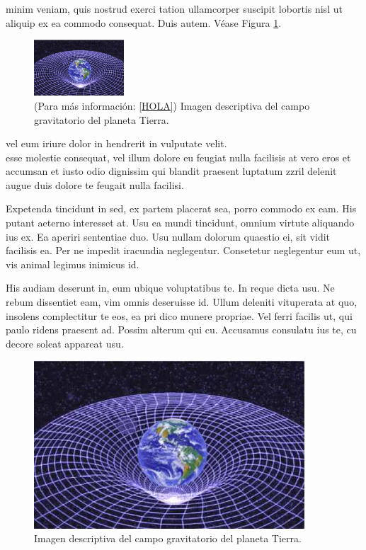 \documentclass[a4paper, 11pt, titlepage, twocolumn]{book}
\begin{document}
minim veniam, quis nostrud exerci tation ullamcorper suscipit 
lobortis nisl ut aliquip ex ea commodo consequat. Duis autem. Véase Figura \ref{imagenGravedad}.

\begin{figure}[htp]
    \centering
    \includegraphics[width=0.3\textwidth]{imagen.jpeg}
    \caption{(Para más información: \ref{HOLA}) Imagen descriptiva del campo gravitatorio del planeta Tierra.}
    \label{imagenGravedad}
\end{figure}

vel eum iriure dolor in hendrerit in vulputate velit. \\ esse molestie 
consequat, vel illum dolore eu feugiat nulla facilisis at vero eros 
et accumsan et iusto odio dignissim qui blandit praesent luptatum 
zzril delenit augue duis dolore te feugait nulla facilisi.

Expetenda tincidunt in sed, ex partem placerat sea, porro commodo ex eam. His putant aeterno interesset at. Usu ea mundi tincidunt, omnium virtute aliquando ius ex. Ea aperiri sententiae duo. Usu nullam dolorum quaestio ei, sit vidit facilisis ea. Per ne impedit iracundia neglegentur. Consetetur neglegentur eum ut, vis animal legimus inimicus id.

His audiam deserunt in, eum ubique voluptatibus te. In reque dicta usu. Ne rebum dissentiet eam, vim omnis deseruisse id. Ullum deleniti vituperata at quo, insolens complectitur te eos, ea pri dico munere propriae. Vel ferri facilis ut, qui paulo ridens praesent ad. Possim alterum qui cu. Accusamus consulatu ius te, cu decore soleat appareat usu.

\begin{figure}[htp]
    \centering
    \includegraphics[width=0.9\textwidth]{imagen.jpeg}
    \caption{Imagen descriptiva del campo gravitatorio del planeta Tierra.}
    \label{}
\end{figure}
\end{document}
